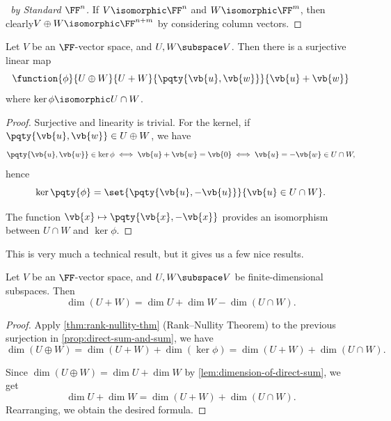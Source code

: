 \begin{proof}[\proofname\ by Standard \(\FF^n\)]
    If \(V \isomorphic \FF^n\) and \(W \isomorphic \FF^m\), then clearly\(V \oplus W \isomorphic \FF^{n + m}\) by considering column vectors.
\end{proof}

\begin{proposition}
    \label{prop:direct-sum-and-sum}%
    Let \(V\) be an \(\FF\)-vector space, and \(U, W \subspace V\). Then there is a surjective linear map
    \[
        \function{\phi}{U \oplus W}{U + W}{\pqty{\vb{u}, \vb{w}}}{\vb{u} + \vb{w}}
    \]
    where \(\ker \phi \isomorphic U \cap W\).
\end{proposition}

\begin{proof}
    Surjective and linearity is trivial. For the kernel, if \(\pqty{\vb{u}, \vb{w}} \in U \oplus W\), we have
    \[
        \pqty{\vb{u}, \vb{w}} \in \ker \phi \iff \vb{u} + \vb{w} = \vb{0} \iff \vb{u} = -\vb{w} \in U \cap W,
    \]
    hence
    \[
        \ker\pqty{\phi} = \set{\pqty{\vb{u}, -\vb{u}}}{\vb{u} \in U \cap W}.
    \]

    The function \(\vb{x} \mapsto \pqty{\vb{x}, - \vb{x}}\) provides an isomorphism between \(U \cap W\) and \(\ker \phi\).
\end{proof}

This is very much a technical result, but it gives us a few nice results.

\begin{corollary}
    \label{cor:sum-intersection-formula}%
    Let \(V\) be an \(\FF\)-vector space, and \(U, W \subspace V\) be finite-dimensional subspaces. Then
    \[
        \dim(U + W) = \dim U + \dim W - \dim(U \cap W).
    \]
\end{corollary}

\begin{proof}
    Apply \autoref{thm:rank-nullity-thm} (Rank--Nullity Theorem) to the previous surjection in \autoref{prop:direct-sum-and-sum}, we have
    \[
        \dim(U \oplus W) = \dim(U + W) + \dim(\ker \phi) = \dim(U + W) + \dim(U \cap W).
    \]

    Since \(\dim(U \oplus W) = \dim U + \dim W\) by \autoref{lem:dimension-of-direct-sum}, we get
    \[
        \dim U + \dim W = \dim(U + W) + \dim(U \cap W).
    \]
    Rearranging, we obtain the desired formula.
\end{proof}


